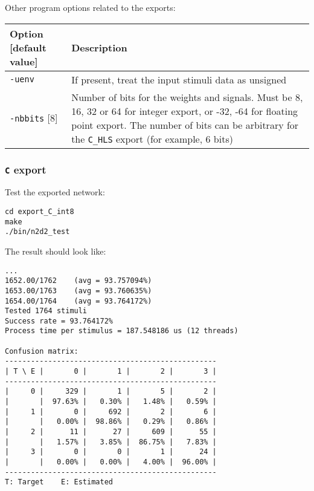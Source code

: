 \documentclass[a4paper,11pt,oneside]{article}
\newcommand{\iponly}{\reversemarginpar
    \marginnote{\color{listletiblue}\normalfont\scriptsize
    {\ttfamily{}\hyperref[sec:N2D2-IP]{\color{listletiblue}N2D2 IP}} \emph{only}}}
\begin{document}
Other program options related to the exports:
\begin{center}
 \begin{tabular}{| p{5cm} | p{10cm} | }
 \hline
 Option [default value] & Description\\
 \hline\hline
  \lstinline!-uenv! & If present, treat the input stimuli data as unsigned \\
  \lstinline!-nbbits! [8] & Number of bits for the weights and signals.
  Must be 8, 16, 32 or 64 for integer export, or -32, -64 for floating
  point export. The number of bits can be arbitrary for the \lstinline!C_HLS!
  export (for example, 6 bits) \\
 \hline
\end{tabular}
\end{center}


\subsubsection{\texorpdfstring{%
\lstinline[basicstyle=\ttfamily\bfseries]!C! export\protect\iponly}{C export}}

Test the exported network:
\begin{lstlisting}
cd export_C_int8
make
./bin/n2d2_test
\end{lstlisting}

The result should look like:
\begin{lstlisting}[style=console]
...
1652.00/1762    (avg = 93.757094%)
1653.00/1763    (avg = 93.760635%)
1654.00/1764    (avg = 93.764172%)
Tested 1764 stimuli
Success rate = 93.764172%
Process time per stimulus = 187.548186 us (12 threads)

Confusion matrix:
-------------------------------------------------
| T \ E |       0 |       1 |       2 |       3 |
-------------------------------------------------
|     0 |     329 |       1 |       5 |       2 |
|       |  97.63% |   0.30% |   1.48% |   0.59% |
|     1 |       0 |     692 |       2 |       6 |
|       |   0.00% |  98.86% |   0.29% |   0.86% |
|     2 |      11 |      27 |     609 |      55 |
|       |   1.57% |   3.85% |  86.75% |   7.83% |
|     3 |       0 |       0 |       1 |      24 |
|       |   0.00% |   0.00% |   4.00% |  96.00% |
-------------------------------------------------
T: Target    E: Estimated
\end{lstlisting}
\end{document}
